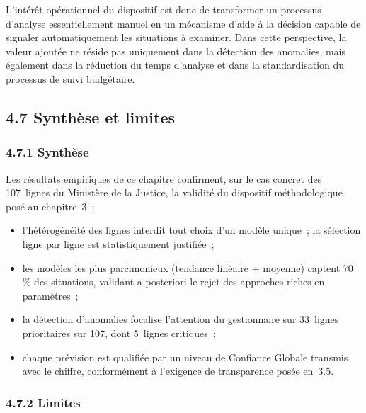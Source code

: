 L'int\'er\^et op\'erationnel du dispositif est donc de transformer un
processus d'analyse essentiellement manuel en un m\'ecanisme d'aide \`a
la d\'ecision capable de signaler automatiquement les situations \`a
examiner. Dans cette perspective, la valeur ajout\'ee ne r\'eside pas
uniquement dans la d\'etection des anomalies, mais \'egalement dans la
r\'eduction du temps d'analyse et dans la standardisation du processus
de suivi budg\'etaire.

\subsection*{4.7 \quad Synth\`ese et limites}

\subsubsection*{4.7.1 \quad Synth\`ese}

Les r\'esultats empiriques de ce chapitre confirment, sur le cas concret des
107~lignes du Minist\`ere de la Justice, la validit\'e du dispositif
m\'ethodologique pos\'e au chapitre~3~:

\begin{itemize}
    \item l'h\'et\'erog\'en\'eit\'e des lignes interdit tout choix d'un mod\`ele
    unique~; la s\'election ligne par ligne est statistiquement justifi\'ee~;
    \item les mod\`eles les plus parcimonieux (tendance lin\'eaire + moyenne)
    captent 70\,\% des situations, validant a posteriori le rejet des
    approches riches en param\`etres~;
    \item la d\'etection d'anomalies focalise l'attention du gestionnaire sur
    33~lignes prioritaires sur 107, dont 5~lignes critiques~;
    \item chaque pr\'evision est qualifi\'ee par un niveau de Confiance Globale
    transmis avec le chiffre, conform\'ement \`a l'exigence de transparence pos\'ee
    en~3.5.
\end{itemize}

\subsubsection*{4.7.2 \quad Limites}

